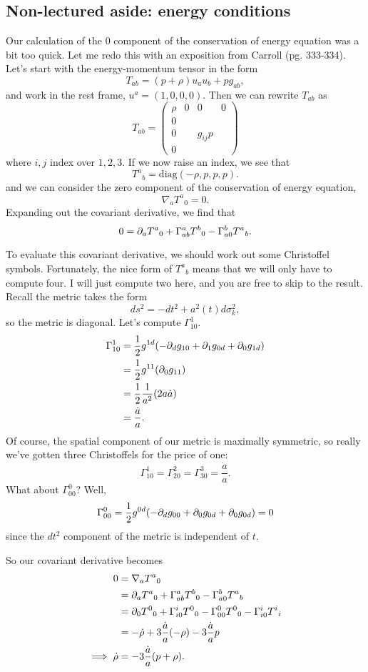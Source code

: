 \subsection*{Non-lectured aside: energy conditions}
Our calculation of the $0$ component of the conservation of energy equation was a bit too quick. Let me redo this with an exposition from Carroll (pg. 333-334). Let's start with the energy-momentum tensor in the form
$$T_{ab}=(p+\rho)u_a u_b +p g_{ab},$$
and work in the rest frame, $u^a=(1,0,0,0).$ Then we can rewrite $T_{ab}$ as
$$T_{ab}=\begin{pmatrix}
\rho&0&0&0\\
0&&&\\
0&&g_{ij}p&\\
0&&&
\end{pmatrix}$$
where $i,j$ index over $1,2,3$.
If we now raise an index, we see that
$${T^a}_b=\text{diag}(-\rho,p,p,p).$$
and we can consider the zero component of the conservation of energy equation,
$$\nabla_a {T^a}_0=0.$$
Expanding out the covariant derivative, we find that
$$0=\partial_a {T^a}_0+\Gamma^a_{ab}{T^b}_0-\Gamma^b_{a0}{T^a}_b.$$

To evaluate this covariant derivative, we should work out some Christoffel symbols. Fortunately, the nice form of ${T^a}_b$ means that we will only have to compute four. I will just compute two here, and you are free to skip to the result.
Recall the metric takes the form $$ds^2=-dt^2+a^2(t)d\sigma_k^2,$$
so the metric is diagonal. Let's compute $\Gamma^1_{10}.$
\begin{align*}
    \Gamma^1_{10}&=\frac{1}{2}g^{1d}(-\partial_d g_{10}+\partial_1 g_{0d}+\partial_0 g_{1d})\\
    &=\frac{1}{2}g^{11}(\partial_0 g_{11})\\
    &=\frac{1}{2} \frac{1}{a^2} (2 a\dot a)\\
    &=\frac{\dot a}{a}.
\end{align*}
Of course, the spatial component of our metric is maximally symmetric, so really we've gotten three Christoffels for the price of one:
$$\Gamma^1_{10}=\Gamma^2_{20}=\Gamma^3_{30}=\frac{\dot a}{a}.$$
What about $\Gamma^0_{00}$? Well,
$$\Gamma^0_{00}=\frac{1}{2}g^{0d}(-\partial_d g_{00}+\partial_0 g_{0d}+\partial_0 g_{0d})=0$$
since the $dt^2$ component of the metric is independent of $t$.

So our covariant derivative becomes
\begin{align*}
    0&=\nabla_a T^a{}_0\\
    &=\partial_a T^a{}_0+ \Gamma^a_{ab}T^b{}_0-\Gamma^b_{a0}T^a{}_b\\
    &=\partial_0 T^0{}_0+ \Gamma^i_{i0}T^0{}_0-\Gamma^0_{00}T^0{}_0-\Gamma^i_{i0}T^i{}_i\\
    &=-\dot \rho+ 3\frac{\dot a}{a}(-\rho)-3\frac{\dot a}{a}p\\
    \implies \dot \rho &=-3\frac{\dot a}{a}(p+\rho).
\end{align*}

